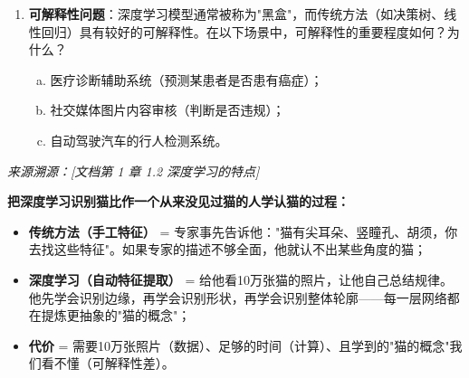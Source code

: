 \documentclass[a4paper,11pt]{ctexart}
\begin{document}
\begin{problembox}
\begin{enumerate}[(1)]
        \begin{enumerate}[a.]
            \item 解释为什么深度学习对数据量的需求远高于传统机器学习（从参数数量和过拟合的角度）；
            \item 当数据量不足时，有哪些常用的应对策略？（至少列举三种）
        \end{enumerate}

        \item \textbf{可解释性问题}：深度学习模型通常被称为"黑盒"，而传统方法（如决策树、线性回归）具有较好的可解释性。在以下场景中，可解释性的重要程度如何？为什么？
        \begin{enumerate}[a.]
            \item 医疗诊断辅助系统（预测某患者是否患有癌症）；
            \item 社交媒体图片内容审核（判断是否违规）；
            \item 自动驾驶汽车的行人检测系统。
        \end{enumerate}
    \end{enumerate}

    \vspace{0.2cm}
    {\color{gray}\small\textit{来源溯源：[文档第 1 章 1.2 深度学习的特点]}}
\end{problembox}

\begin{metaphorbox}
    \textbf{把深度学习识别猫比作一个从来没见过猫的人学认猫的过程：}

    \begin{itemize}
        \item \textbf{传统方法（手工特征）} = 专家事先告诉他："猫有尖耳朵、竖瞳孔、胡须，你去找这些特征"。如果专家的描述不够全面，他就认不出某些角度的猫；
        \item \textbf{深度学习（自动特征提取）} = 给他看10万张猫的照片，让他自己总结规律。他先学会识别边缘，再学会识别形状，再学会识别整体轮廓——每一层网络都在提炼更抽象的"猫的概念"；
        \item \textbf{代价} = 需要10万张照片（数据）、足够的时间（计算）、且学到的"猫的概念"我们看不懂（可解释性差）。
    \end{itemize}
\end{metaphorbox}
\end{document}
